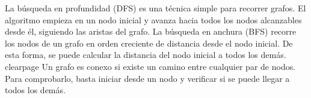 {}
\markdownRendererSectionEnd 
\markdownRendererSectionEnd \markdownRendererSectionBegin
{}\markdownRendererInterblockSeparator
{}
\markdownRendererSectionEnd \markdownRendererSectionBegin
{}\markdownRendererInterblockSeparator
{}\markdownRendererParagraphSeparator
{}
\markdownRendererSectionEnd 
\markdownRendererSectionEnd \markdownRendererSectionBegin
{}\markdownRendererInterblockSeparator
{}\markdownRendererSectionBegin
{}\markdownRendererInterblockSeparator
{}La búsqueda en profundidad (DFS) es una técnica simple para recorrer grafos.\markdownRendererParagraphSeparator
{}El algoritmo empieza en un nodo inicial y avanza hacia todos los nodos alcanzables desde él, siguiendo las aristas del grafo.\markdownRendererParagraphSeparator
{}\markdownRendererSectionBegin
{}\markdownRendererInterblockSeparator
{}\markdownRendererInterblockSeparator
{}
\markdownRendererSectionEnd \markdownRendererSectionBegin
{}\markdownRendererInterblockSeparator
{}\markdownRendererParagraphSeparator
{}
\markdownRendererSectionEnd 
\markdownRendererSectionEnd 
\markdownRendererSectionEnd \markdownRendererSectionBegin
{}\markdownRendererInterblockSeparator
{}La búsqueda en anchura (BFS) recorre los nodos de un grafo en orden creciente de distancia desde el nodo inicial.\markdownRendererParagraphSeparator
{}De esta forma, se puede calcular la distancia del nodo inicial a todos los demás.\markdownRendererParagraphSeparator
{}\markdownRendererInterblockSeparator
{}\markdownRendererDollarSign{}\markdownRendererBackslash{}clearpage\markdownRendererDollarSign{}\markdownRendererInterblockSeparator
{}
\markdownRendererSectionEnd \markdownRendererSectionBegin
{}\markdownRendererInterblockSeparator
{}\markdownRendererSectionBegin
{}\markdownRendererInterblockSeparator
{}Un grafo es conexo si existe un camino entre cualquier par de nodos. Para comprobarlo, basta iniciar desde un nodo y verificar si se puede llegar a todos los demás.\markdownRendererInterblockSeparator
